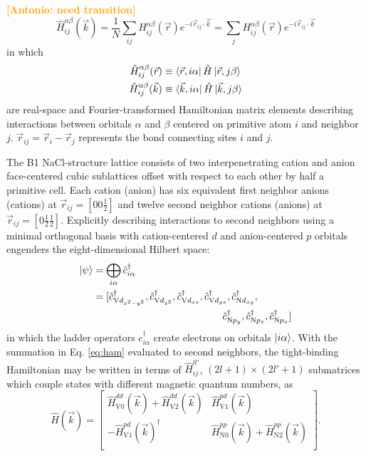 \documentclass[twocolumn,showpacs,preprintnumbers,superscriptaddress,prb,floatfix,aps,10pt]{revtex4-1}
\newcommand{\abmei}[1]{\textcolor{orange}{ \bf [Antonio: #1] }}
\newcommand*{\ham}{\hat{H}}
\newcommand*{\bondvec}{\vec{r}_{ij}}
\begin{document}
\abmei{need transition}
\begin{equation}
\label{eq:ham}
\ham^{\alpha\beta}_{ij}(\vec{k}) 
= \frac{1}{N} \sum_{ij} H^{\alpha\beta}_{ij}(\vec{r}) e^{-i\vec{r}_{ij} \cdot \vec{k} } 
= \sum_j H^{\alpha\beta}_{ij}(\vec{r}) e^{-i\vec{r}_{ij} \cdot \vec{k}}
\end{equation}
%
in which
%
\begin{align}
\ham^{\alpha\beta}_{ij}(\vec{r}) &\equiv \bra{\vec{r},i\alpha} \ham\ket{\vec{r},j\beta} \\
\ham^{\alpha\beta}_{ij}(\vec{k}) &\equiv \bra{\vec{k},i\alpha} \ham\ket{\vec{k},j\beta}
\end{align}
%
are real-space and Fourier-transformed Hamiltonian matrix elements describing interactions between orbitals $\alpha$ and $\beta$ centered on primitive atom $i$ and neighbor $j$. $\bondvec = \vec{r}_i - \vec{r}_j$ represents the bond connecting sites $i$ and $j$. 

The B1 NaCl-structure lattice consists of two interpenetrating cation and anion face-centered cubic sublattices offset with respect to each other by half a primitive cell. Each cation (anion) has six equivalent first neighbor anions (cations) at $\bondvec = [0 0 \frac{1}{2}]$ and twelve second neighbor cations (anions) at $\bondvec = [0 \frac{1}{2} \frac{1}{2}]$. Explicitly describing interactions to second neighbors using a minimal orthogonal basis with cation-centered $d$ and anion-centered $p$ orbitals engenders the eight-dimensional Hilbert space:
\begin{align}
\label{eq:hilbert}
\ket{\psi} &= \bigoplus_{i\alpha} \hat{c}_{i\alpha}^\dag \\
&= [
  \hat{c}^\dag_{\textrm{V} d_{x^2-y^2}},
  \hat{c}^\dag_{\textrm{V} d_{z^2}},
  \hat{c}^\dag_{\textrm{V} d_{xz}},
  \hat{c}^\dag_{\textrm{V} d_{yz}},
  \hat{c}^\dag_{\textrm{N} d_{xy}}, \\
& \quad\quad\quad\quad\quad\quad\quad\quad\quad\quad\quad\quad\quad
  \hat{c}^\dag_{\textrm{N} p_{y}},
  \hat{c}^\dag_{\textrm{N} p_{z}},
  \hat{c}^\dag_{\textrm{N} p_{x}}]
\end{align}
%
in which the ladder operators $c^\dag_{i\alpha}$ create electrons on orbitals $\ket{i\alpha}$. With the summation in Eq. \ref{eq:ham} evaluated to second neighbors, the tight-binding Hamiltonian may be written in terms of $\ham_{ij}^{ll'}$, $(2l+1)\times(2l'+1)$ submatrices which couple states with different magnetic quantum numbers, as
%
\begin{equation}
\label{eq:ham_explicit}
\ham(\vec{k}) = 
\begin{bmatrix}
\ham_{\textrm{V}0}^{dd}(\vec{k}) + \ham_{\textrm{V}2}^{dd}(\vec{k}) &\ham_{\textrm{V}1}^{pd}(\vec{k}) \\
- \ham_{\textrm{V}1}^{pd}(\vec{k})^{\dagger} & \ham_{\textrm{N}0}^{pp}(\vec{k}) + \ham_{\textrm{N}2}^{pp}(\vec{k}) \\
\end{bmatrix} .
\end{equation}
\end{document}
